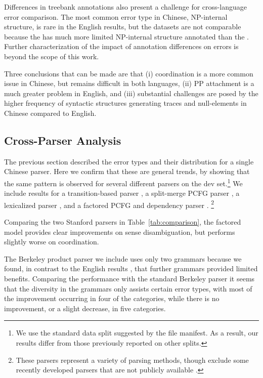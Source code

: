 Differences in treebank annotations also present a challenge for cross-language error comparison.
The most common error type in Chinese, NP-internal structure, is rare in the English results, but the datasets are not comparable because the \ptb has much more limited NP-internal structure annotated than the \pctb.
Further characterization of the impact of annotation differences on errors is beyond the scope of this work.

Three conclusions that can be made are that (i) coordination is a more common issue in Chinese, but remains difficult in
both languages, (ii) PP attachment is a much greater problem in English, and
(iii) substantial challenges are posed by the higher frequency of
syntactic structures generating traces and null-elements in Chinese compared to English.

\subsection{Cross-Parser Analysis} \label{sec:cross_parser_analysis}

The previous section described the error types and their distribution for a single Chinese parser.
Here we confirm that these are general trends, by showing that the same pattern
is observed for several different parsers on the  dev set.\footnote{
  We use the standard data split suggested by the  file manifest.
  As a result, our results differ from those previously reported on other splits.
}
We include results for
a transition-based parser \parencite[ZPAR;][]{Zhang-Clark:2009:ICPT},
a split-merge PCFG parser \parencite{Petrov-etal:2006,Petrov-Klein:2007,Petrov:2010:NAACLHLT},
a lexicalized parser \parencite{Bikel-Chiang:2000:CLP},
and a factored PCFG and dependency parser
\parencite{Levy-Manning:2003:ACL,Klein-Manning:2003:ACL,Klein-Manning:2003:NIPS}.
\footnote{These parsers represent a variety of parsing methods, though exclude
some recently developed parsers that are not publicly
available \parencite{Qian-Liu:2012:EMNLP,Xiong-etal:2005:IJCNLP}.}

Comparing the two Stanford parsers in Table~\ref{tab:comparison}, the factored
model provides clear improvements on sense disambiguation, but performs
slightly worse on coordination.

The Berkeley product parser we include uses only two grammars because we found,
in contrast to the English results \parencite{Petrov:2010:NAACLHLT}, that further
grammars provided limited benefits.  Comparing the performance with the
standard Berkeley parser it seems that the diversity in the grammars only
assists certain error types, with most of the improvement occurring in four of
the categories, while there is no improvement, or a slight decrease, in five categories.

